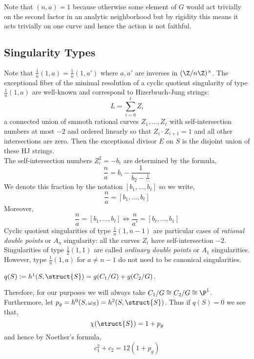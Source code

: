 \documentclass[12pt]{article}
\begin{document}
\begin{rmk}
Note that $(n,a) = 1$ because otherwise some element of $G$ would act trivially on the second factor in an analytic neighborhood but by rigidity this means it acts trivially on one curve and hence the action is not faithful. 
\end{rmk}

\subsection{Singularity Types}

Note that $\frac{1}{n}(1,a) = \frac{1}{n}(1,a')$ where $a, a'$ are inverses in $(\Z / n \Z)^\times$. The exceptional fiber of the minimal resolution of a cyclic quotient singularity of type $\frac{1}{n}(1,a)$ are well-known and correspond to Hizerbruch-Jung strings:
\[ L = \sum_{i = 0}^\ell Z_i \]
a connected union of smmoth rational curves $Z_1, \dots, Z_\ell$ with self-intersection numbers at most $-2$ and ordered linearly so that $Z_i \cdot Z_{i+1} = 1$ and all other intersections are zero. Then the exceptional divisor $E$ on $S$ is the disjoint union of these HJ strings. 
\bigskip\\
The self-intersection numbers $Z_i^2 = -b_i$ are determined by the formula,
\[ \frac{n}{a} = b_i - \frac{1}{b_2 - \frac{1}{\cdots}} \]
We denote this fraction by the notation $[b_1, \dots, b_{\ell}]$ so we write,
\[ \frac{n}{a} = [b_1, \dots, b_\ell] \]
Moreover,
\[ \frac{n}{a} = [b_1, \dots, b_\ell] \iff \frac{n}{a'} = [b_\ell, \dots, b_1] \]
Cyclic quotient singularities of type $\frac{1}{n}(1, n-1)$ are particular cases of \textit{rational double points} or $A_n$ singularity: all the curves $Z_i$ have self-intersection $-2$. Singularities of type $\frac{1}{2}(1,1)$ are called \textit{ordinary double points} or $A_1$ singularities. However, type $\frac{1}{n}(1,a)$ for $a \neq n-1$ do not need to be canonical singularities.  


\begin{prop}
$q(S) : = h^1(S, \struct{S}) = g(C_1/G) + g(C_2/G)$.
\end{prop}

Therefore, for our purposes we will always take $C_1 / G \cong C_2 / G \cong \P^1$. 
\bigskip\\
Furthermore, let $p_g = h^0(S, \omega_S) = h^2(S, \struct{S})$. Thus if $q(S) = 0$ we see that,
\[ \chi(\struct{S}) = 1 + p_g \]
and hence by Noether's formula,
\[ c_1^2 + c_2 = 12 (1 + p_g) \]
\end{document}
